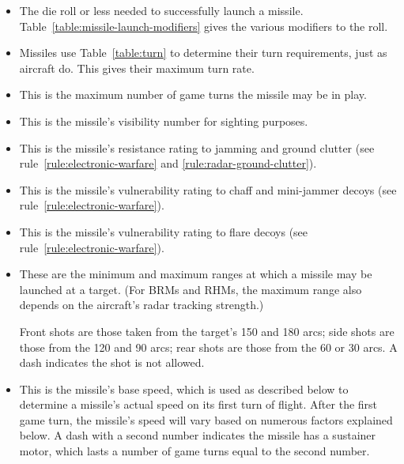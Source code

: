 {\begin{itemize}
    \item {} The die roll or less needed to successfully launch a missile. Table~\ref{table:missile-launch-modifiers} gives the various modifiers to the roll.

    \item {} Missiles use Table~\ref{table:turn} to determine their turn requirements, just as aircraft do. This gives their maximum turn rate.

    \item {} This is the maximum number of game turns the missile may be in play.

    \item {} This is the missile's visibility number for sighting purposes.

    \item {} This is the missile's resistance rating to jamming and ground clutter (see rule~\ref{rule:electronic-warfare} and \ref{rule:radar-ground-clutter}).

    \item {} This is the missile's vulnerability rating to chaff and mini-jammer decoys (see rule~\ref{rule:electronic-warfare}).

    \item {} This is the missile's vulnerability rating to flare decoys (see rule~\ref{rule:electronic-warfare}).

    \item {} These are the minimum and maximum ranges at which a missile may be launched at a target. (For BRMs and RHMs, the maximum range also depends on the aircraft's radar tracking strength.)

    Front shots are those taken from the target's 150{\deg} and 180{\deg} arcs; side shots are those from the 120{\deg} and 90{\deg} arcs; rear shots are those from the 60{\deg} or 30{\deg} arcs. A dash indicates the shot is not allowed.

    \item {} This is the missile's base speed, which is used as described below to determine a missile's actual speed on its first turn of flight. After the first game turn, the missile's speed will vary based on numerous factors explained below. A dash with a second number indicates the missile has a sustainer motor, which lasts a number of game turns equal to the second number.


\end{itemize}}
